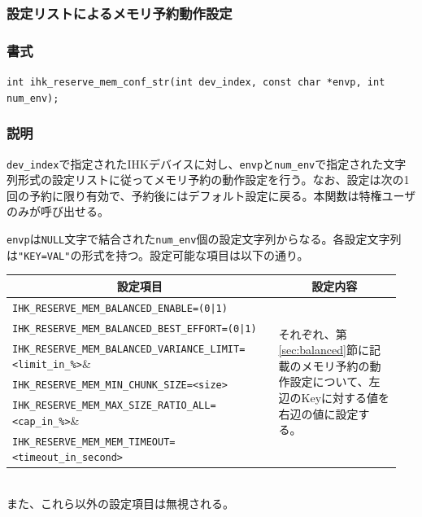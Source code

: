\documentclass[twoside,11pt,fleqn]{book}
\begin{document}
\subsubsection{設定リストによるメモリ予約動作設定}
\subsubsection*{書式}{\quad} \verb:int ihk_reserve_mem_conf_str(int dev_index, const char *envp, int num_env);:
\subsubsection*{説明}{\quad} \verb:dev_index:で指定されたIHKデバイスに対し、\verb:envp:と\verb:num_env:で指定された文字列形式の設定リストに従ってメモリ予約の動作設定を行う。なお、設定は次の1回の予約に限り有効で、予約後にはデフォルト設定に戻る。本関数は特権ユーザのみが呼び出せる。

\verb:envp:は\verb:NULL:文字で結合された\verb:num_env:個の設定文字列からなる。各設定文字列は\verb:"KEY=VAL":の形式を持つ。設定可能な項目は以下の通り。
\begin{table}[!h]
\footnotesize
\begin{tabular}{|p{0.65\linewidth}|p{0.30\linewidth}|} \hline
\multicolumn{1}{|c}{\textbf{設定項目}}&\multicolumn{1}{|c|}{\textbf{設定内容}}\\ \hline \hline
\verb:IHK_RESERVE_MEM_BALANCED_ENABLE=(0|1):&\multirow{6}{\linewidth}{それぞれ、第\ref{sec:balanced}節に記載のメモリ予約の動作設定について、左辺のKeyに対する値を右辺の値に設定する。}\\
\verb:IHK_RESERVE_MEM_BALANCED_BEST_EFFORT=(0|1):&\\
\verb:IHK_RESERVE_MEM_BALANCED_VARIANCE_LIMIT=<limit_in_%>:&\\
\verb:IHK_RESERVE_MEM_MIN_CHUNK_SIZE=<size>:&\\
\verb:IHK_RESERVE_MEM_MAX_SIZE_RATIO_ALL=<cap_in_%>:&\\
\verb:IHK_RESERVE_MEM_MEM_TIMEOUT=<timeout_in_second>:&\\ \hline
\end{tabular}
\vspace{-0em}
\end{table}
\\また、これら以外の設定項目は無視される。
\FloatBarrier
\end{document}
